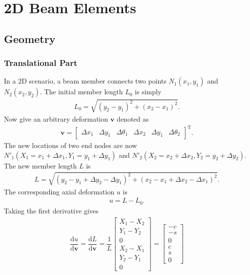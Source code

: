 \documentclass[11pt]{article}
\begin{document}
\section{2D Beam Elements}
\subsection{Geometry}
\subsubsection{Translational Part}
In a 2D scenario, a beam member connects two points $N_1(x_1,y_1)$ and $N_2(x_2,y_2)$. The initial member length $L_0$ is simply
\begin{gather}
L_0=\sqrt{(y_2-y_1)^2+(x_2-x_1)^2}.
\end{gather}
Now give an arbitrary deformation $\mathbf{v}$ denoted as
\begin{gather}
\mathbf{v}=\begin{bmatrix}
\Delta{}x_1&\Delta{}y_1&\Delta{}\theta_1&\Delta{}x_2&\Delta{}y_1&\Delta{}\theta_2
\end{bmatrix}^\mathrm{T}.
\end{gather}
The new locations of two end nodes are now $N'_1(X_1=x_1+\Delta{}x_1,Y_1=y_1+\Delta{}y_1)$ and $N'_2(X_2=x_2+\Delta{}x_2,Y_2=y_2+\Delta{}y_2)$. The new member length $L$ is
\begin{gather}
L=\sqrt{(y_2-y_1+\Delta{}y_2-\Delta{}y_1)^2+(x_2-x_1+\Delta{}x_2-\Delta{}x_1)^2}.
\end{gather}
The corresponding axial deformation $u$ is
\begin{gather}
u=L-L_0.
\end{gather}
Taking the first derivative gives
\begin{gather}
\dfrac{\mathrm{d}u}{\mathrm{d}\mathbf{v}}=\dfrac{\mathrm{d}L}{\mathrm{d}\mathbf{v}}=\dfrac{1}{L}\begin{bmatrix}
X_1-X_2\\Y_1-Y_2\\0\\X_2-X_1\\Y_2-Y_1\\0
\end{bmatrix}=\begin{bmatrix}
-c\\-s\\0\\c\\s\\0
\end{bmatrix}
\end{gather}
\end{document}
